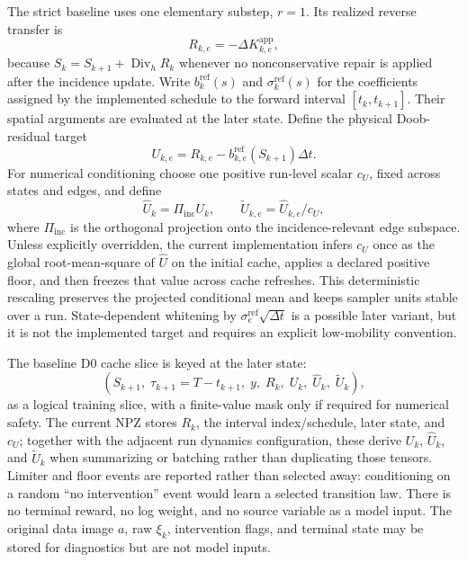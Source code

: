 \documentclass[11pt]{article}
\numberwithin{equation}{section}
\newcommand{\dive}{\operatorname{Div}_h}
\newcommand{\1}{\mathbf 1}
\begin{document}
The strict baseline uses one elementary substep, \(r=1\).  Its realized reverse transfer is
\begin{equation}\label{eq:realized-reverse-transfer-d0}
  R_{k,e}=-\Delta K^{\mathrm{app}}_{k,e},
\end{equation}
because \(S_k=S_{k+1}+\dive R_k\) whenever no nonconservative repair is applied after the incidence update.  Write \(b_{k}^{\mathrm{ref}}(s)\) and \(\sigma_k^{\mathrm{ref}}(s)\) for the coefficients assigned by the implemented schedule to the forward interval \([t_k,t_{k+1}]\).  Their spatial arguments are evaluated at the later state.  Define the physical Doob-residual target
\begin{equation}\label{eq:physical-residual-target-d0}
  U_{k,e}=R_{k,e}
  -b_{k,e}^{\mathrm{ref}}(S_{k+1})\Delta t.
\end{equation}
For numerical conditioning choose one positive run-level scalar \(c_U\), fixed across states and edges, and define
\begin{equation}\label{eq:scaled-residual-target-d0}
  \widehat U_k=\Pi_{\mathrm{inc}}U_k,
  \qquad
  \widetilde U_{k,e}=\widehat U_{k,e}/c_U,
\end{equation}
where \(\Pi_{\mathrm{inc}}\) is the orthogonal projection onto the incidence-relevant edge subspace.  Unless explicitly overridden, the current implementation infers \(c_U\) once as the global root-mean-square of \(\widehat U\) on the initial cache, applies a declared positive floor, and then freezes that value across cache refreshes.  This deterministic rescaling preserves the projected conditional mean and keeps sampler units stable over a run.  State-dependent whitening by \(\sigma_e^{\mathrm{ref}}\sqrt{\Delta t}\) is a possible later variant, but it is not the implemented target and requires an explicit low-mobility convention.

The baseline D0 cache slice is keyed at the later state:
\begin{equation}\label{eq:d0-cache-slice}
  \left(S_{k+1},\; \tau_{k+1}=T-t_{k+1},\; y,\; R_k,\; U_k,\; \widehat U_k,\; \widetilde U_k\right),
\end{equation}
as a logical training slice, with a finite-value mask only if required for numerical safety.  The current NPZ stores \(R_k\), the interval index/schedule, later state, and \(c_U\); together with the adjacent run dynamics configuration, these derive \(U_k\), \(\widehat U_k\), and \(\widetilde U_k\) when summarizing or batching rather than duplicating those tensors.  Limiter and floor events are reported rather than selected away: conditioning on a random ``no intervention'' event would learn a selected transition law.  There is no terminal reward, no log weight, and no source variable as a model input.  The original data image \(a\), raw \(\xi_k\), intervention flags, and terminal state may be stored for diagnostics but are not model inputs.
\end{document}
